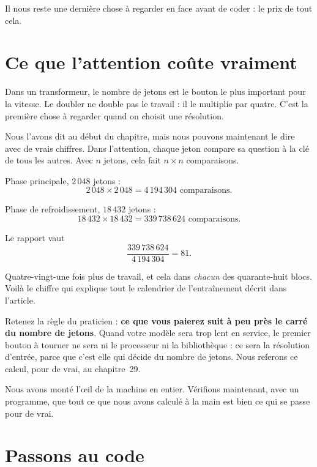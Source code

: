 Il nous reste une dernière chose à regarder en face avant de coder : le prix
de tout cela.

\section{Ce que l'attention coûte vraiment}

\begin{enclair}
Dans un transformeur, le nombre de jetons est le bouton le plus important
pour la vitesse. Le doubler ne double pas le travail : il le multiplie par
quatre. C'est la première chose à regarder quand on choisit une résolution.
\end{enclair}

Nous l'avons dit au début du chapitre, mais nous pouvons maintenant le dire
avec de vrais chiffres. Dans l'attention, chaque jeton compare sa question à
la clé de tous les autres. Avec $n$ jetons, cela fait $n \times n$
comparaisons.

\begin{exemple}
Phase principale, $2\,048$ jetons :
\[ 2\,048 \times 2\,048 = 4\,194\,304 \text{ comparaisons.} \]

Phase de refroidissement, $18\,432$ jetons :
\[ 18\,432 \times 18\,432 = 339\,738\,624 \text{ comparaisons.} \]

Le rapport vaut
\[ \frac{339\,738\,624}{4\,194\,304} = 81 . \]

Quatre-vingt-une fois plus de travail, et cela dans \emph{chacun} des
quarante-huit blocs. Voilà le chiffre qui explique tout le calendrier de
l'entraînement décrit dans l'article.
\end{exemple}

\begin{aretenir}
Retenez la règle du praticien : \textbf{ce que vous paierez suit à peu près
le carré du nombre de jetons}. Quand votre modèle sera trop lent
en service, le premier bouton à tourner ne sera ni le processeur ni la
bibliothèque : ce sera la résolution d'entrée, parce que c'est elle qui
décide du nombre de jetons. Nous referons ce calcul, pour de vrai, au
chapitre~29.
\end{aretenir}

Nous avons monté l'œil de la machine en entier. Vérifions maintenant, avec
un programme, que tout ce que nous avons calculé à la main est bien ce qui se
passe pour de vrai.

\section{Passons au code}

